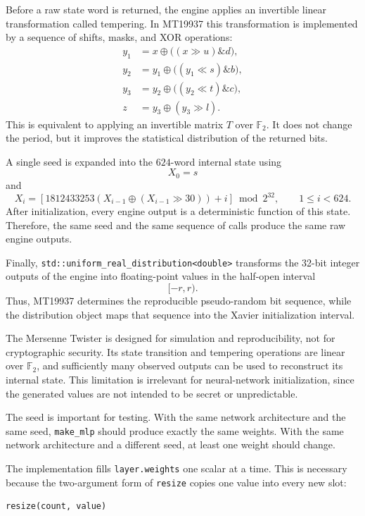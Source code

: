 \documentclass{article}
\begin{document}
Before a raw state word is returned, the engine applies an invertible
linear transformation called tempering. In MT19937 this transformation
is implemented by a sequence of shifts, masks, and XOR operations:
\[
\begin{aligned}
y_1
&=x\oplus\bigl((x\gg u)\mathbin{\&}d\bigr),\\
y_2
&=y_1\oplus\bigl((y_1\ll s)\mathbin{\&}b\bigr),\\
y_3
&=y_2\oplus\bigl((y_2\ll t)\mathbin{\&}c\bigr),\\
z
&=y_3\oplus(y_3\gg l).
\end{aligned}
\]
This is equivalent to applying an invertible matrix \(T\) over
\(\mathbb{F}_2\). It does not change the period, but it improves the
statistical distribution of the returned bits.

A single seed is expanded into the \(624\)-word internal state using
\[
X_0=s
\]
and
\[
X_i=
\left[
1812433253
\left(
X_{i-1}\oplus(X_{i-1}\gg30)
\right)+i
\right]
\bmod 2^{32},
\qquad
1\le i<624.
\]
After initialization, every engine output is a deterministic function
of this state. Therefore, the same seed and the same sequence of calls
produce the same raw engine outputs.

Finally,
\texttt{std::uniform\_real\_distribution<double>} transforms the
32-bit integer outputs of the engine into floating-point values in the
half-open interval
\[
[-r,r).
\]
Thus, MT19937 determines the reproducible pseudo-random bit sequence,
while the distribution object maps that sequence into the Xavier
initialization interval.

The Mersenne Twister is designed for simulation and reproducibility,
not for cryptographic security. Its state transition and tempering
operations are linear over \(\mathbb{F}_2\), and sufficiently many
observed outputs can be used to reconstruct its internal state.
This limitation is irrelevant for neural-network initialization, since
the generated values are not intended to be secret or unpredictable.

The seed is important for testing. With the same network architecture
and the same seed, \texttt{make\_mlp} should produce exactly the same
weights. With the same network architecture and a different seed, at
least one weight should change.

The implementation fills \texttt{layer.weights} one scalar at a time.
This is necessary because the two-argument form of \texttt{resize}
copies one value into every new slot:

\begin{verbatim}
resize(count, value)
\end{verbatim}
\end{document}
